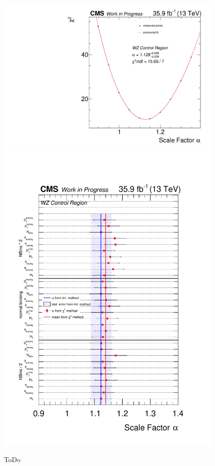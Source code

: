 \begin{figure}[tbp]
 \centering
 \includegraphics[width=\pairwidth]{figures/plots_CR/chi/WZ_met}
 \includegraphics[width=\pairwidth]{figures/plots_CR/chi/WZ_Compare}
 \caption{ToDo}
 \label{fig:chiWZ}
\end{figure}


